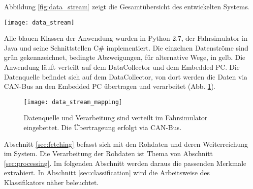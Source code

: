 \label{chap:implementation}

Abbildung \ref{fig:data_stream} zeigt die Gesamtübersicht des entwickelten Systems. 
\begin{figure*} 
  \begin{center}
    \texttt{[image: data\_stream]}
    \caption[Aufbau der Anwendung]{Der Aufbau des entwickelten System zur Müdigkeitserkennung. Grün: Datenströme, blau: Python Klassen der Anwendung, gelb: bedingte Abzweigungen, rosa: Klassen der Fahrsimulatorumgebung\label{fig:data_stream}}
  \end{center}
\end{figure*}
Alle blauen Klassen der Anwendung wurden in Python 2.7, der Fahrsimulator in Java und seine Schnittstellen C\# implementiert. Die einzelnen Datenströme sind grün gekennzeichnet, bedingte Abzweigungen, für alternative Wege, in gelb. Die Anwendung läuft verteilt auf dem DataCollector und dem Embedded PC. Die Datenquelle befindet sich auf dem DataCollector, von dort werden die Daten via CAN-Bus an den Embedded PC übertragen und verarbeitet (Abb. \ref{fig:data_stream_mapping}). 
\begin{figure}[h] 
  \begin{center}
    \texttt{[image: data\_stream\_mapping]}
    \caption[Einbettung der Anwendung]{Datenquelle und Verarbeitung sind verteilt im Fahrsimulator eingebettet. Die Übertrageung erfolgt via CAN-Bus. \label{fig:data_stream_mapping}}
  \end{center}
\end{figure}

\threadingSequence

Abschnitt \ref{sec:fetching} befasst sich mit den Rohdaten und deren Weiterreichung im System. Die Verarbeitung der Rohdaten ist Thema von Abschnitt \ref{sec:processing}. Im folgenden Abschnitt werden daraus die passenden Merkmale extrahiert. In Abschnitt \ref{sec:classification} wird die Arbeitsweise des Klassifikators näher beleuchtet. 


